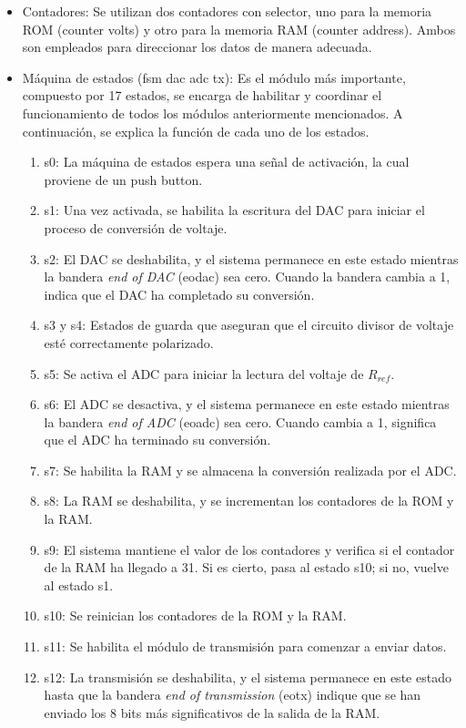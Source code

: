 \begin{itemize}
    \item Contadores: Se utilizan dos contadores con selector, uno para la memoria ROM (counter volts) y otro para la memoria RAM (counter address). Ambos son empleados para direccionar los datos de manera adecuada.

    \item Máquina de estados (fsm dac adc tx): Es el módulo más importante, compuesto por 17 estados, se encarga de habilitar y coordinar el funcionamiento de todos los módulos anteriormente mencionados. A continuación, se explica la función de cada uno de los estados.
    \begin{enumerate}
     \item s0: La máquina de estados espera una señal de activación, la cual proviene de un push button.
     \item s1: Una vez activada, se habilita la escritura del DAC para iniciar el proceso de conversión de voltaje.
     \item s2: El DAC se deshabilita, y el sistema permanece en este estado mientras la bandera \textit{end of DAC} (eodac) sea cero. Cuando la bandera cambia a 1, indica que el DAC ha completado su conversión.
     \item s3 y s4: Estados de guarda que aseguran que el circuito divisor de voltaje esté correctamente polarizado.
     \item s5: Se activa el ADC para iniciar la lectura del voltaje de $R_{ref}$.
     \item s6: El ADC se desactiva, y el sistema permanece en este estado mientras la bandera \textit{end of ADC} (eoadc) sea cero. Cuando cambia a 1, significa que el ADC ha terminado su conversión.
     \item s7: Se habilita la RAM y se almacena la conversión realizada por el ADC.
     \item s8: La RAM se deshabilita, y se incrementan los contadores de la ROM y la RAM.
     \item s9: El sistema mantiene el valor de los contadores y verifica si el contador de la RAM ha llegado a 31. Si es cierto, pasa al estado s10; si no, vuelve al estado s1.
     \item s10: Se reinician los contadores de la ROM y la RAM.
     \item s11: Se habilita el módulo de transmisión para comenzar a enviar datos.
     \item s12: La transmisión se deshabilita, y el sistema permanece en este estado hasta que la bandera \textit{end of transmission} (eotx) indique que se han enviado los 8 bits más significativos de la salida de la RAM. 

\end{enumerate}
\end{itemize}
